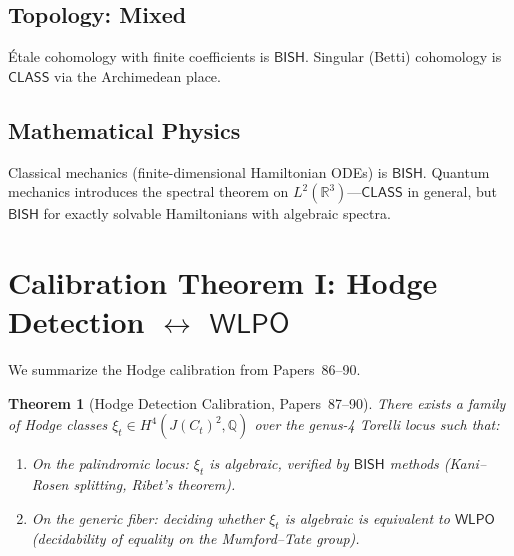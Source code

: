 \documentclass[11pt,a4paper]{article}
\theoremstyle{plain}
\newtheorem{theorem}{Theorem}[section]
\theoremstyle{definition}
\newcommand{\BISH}{\textsf{BISH}}
\newcommand{\WLPO}{\textsf{WLPO}}
\newcommand{\CLASS}{\textsf{CLASS}}
\newcommand{\Q}{\mathbb{Q}}
\newcommand{\R}{\mathbb{R}}
\begin{document}
\subsection{Topology: Mixed}

\'Etale cohomology with finite coefficients is $\BISH$. Singular (Betti) cohomology is $\CLASS$ via the Archimedean place. 

\subsection{Mathematical Physics}

Classical mechanics (finite-dimensional Hamiltonian ODEs) is $\BISH$. Quantum mechanics introduces the spectral theorem on $L^2(\R^3)$---$\CLASS$ in general, but $\BISH$ for exactly solvable Hamiltonians with algebraic spectra.


\section{Calibration Theorem I: Hodge Detection $\leftrightarrow$ $\WLPO$}\label{sec:hodge}

We summarize the Hodge calibration from Papers~86--90.

\begin{theorem}[Hodge Detection Calibration, Papers~87--90]\label{thm:hodge-cal}
There exists a family of Hodge classes $\xi_t \in H^4(J(C_t)^2, \Q)$ over the genus-4 Torelli locus such that:
\begin{enumerate}[label=(\roman*)]
\item On the palindromic locus: $\xi_t$ is algebraic, verified by $\BISH$ methods (Kani--Rosen splitting, Ribet's theorem).
\item On the generic fiber: deciding whether $\xi_t$ is algebraic is equivalent to $\WLPO$ (decidability of equality on the Mumford--Tate group).
\end{enumerate}
\end{theorem}
\end{document}
